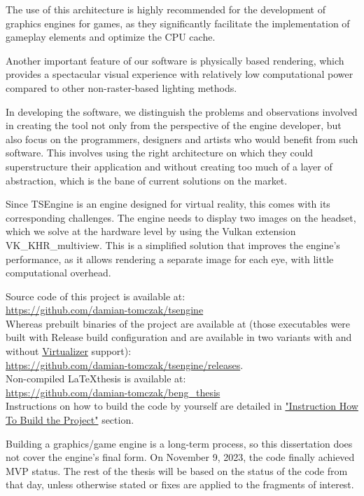 The use of this architecture is highly recommended for the development of graphics engines for games, as they significantly facilitate the implementation of gameplay elements and optimize the CPU cache.

Another important feature of our software is physically based rendering, which provides a spectacular visual experience with relatively low computational power compared to other non-raster-based lighting methods.

In developing the software, we distinguish the problems and observations involved in creating the tool not only from the perspective of the engine developer, but also focus on the programmers, designers and artists who would benefit from such software. This involves using the right architecture on which they could superstructure their application and without creating too much of a layer of abstraction, which is the bane of current solutions on the market.

Since TSEngine is an engine designed for virtual reality, this comes with its corresponding challenges. The engine needs to display two images on the headset, which we solve at the hardware level by using the Vulkan extension VK\_KHR\_multiview. This is a simplified solution that improves the engine's performance, as it allows rendering a separate image for each eye, with little computational overhead.

Source code of this project is available at:\\
\href{https://github.com/damian-tomczak/tsengine}{https://github.com/damian-tomczak/tsengine}\\
Whereas prebuilt binaries of the project are available at (those executables were built with Release build configuration and are available in two variants with and without \hyperref[sec:hardware]{Virtualizer} support):\\
\href{https://github.com/damian-tomczak/tsengine/releases}{https://github.com/damian-tomczak/tsengine/releases}.\\
Non-compiled \LaTeX thesis is available at:\\
\href{https://github.com/damian-tomczak/beng_thesis}{https://github.com/damian-tomczak/beng\_thesis}\\
Instructions on how to build the code by yourself are detailed in \hyperref[sec:how_to_run]{"Instruction How To Build the Project"} section.

Building a graphics/game engine is a long-term process, so this dissertation does not cover the engine's final form.
On November 9, 2023, the code finally achieved MVP status. The rest of the thesis will be based on the status of the code from that day, unless otherwise stated or fixes are applied to the fragments of interest.
\newpage
